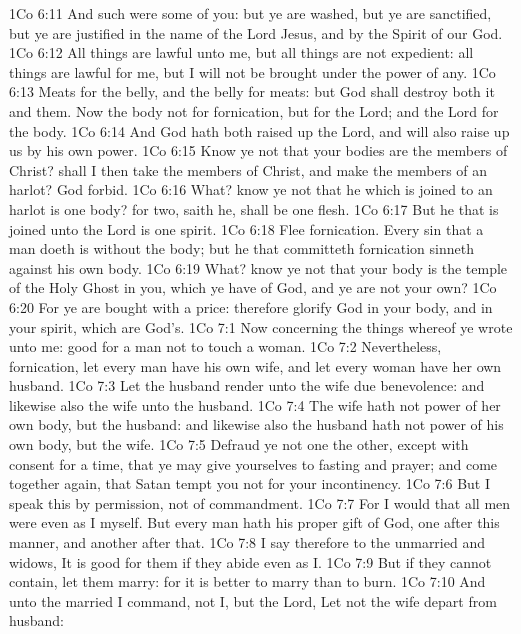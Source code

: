 \vs 1Co 6:11 And such were some of you: but ye are washed, but ye are sanctified, but ye are justified in the name of the Lord Jesus, and by the Spirit of our God.
\vs 1Co 6:12 All things are lawful unto me, but all things are not expedient: all things are lawful for me, but I will not be brought under the power of any.
\vs 1Co 6:13 Meats for the belly, and the belly for meats: but God shall destroy both it and them. Now the body  not for fornication, but for the Lord; and the Lord for the body.
\vs 1Co 6:14 And God hath both raised up the Lord, and will also raise up us by his own power.
\vs 1Co 6:15 Know ye not that your bodies are the members of Christ? shall I then take the members of Christ, and make  the members of an harlot? God forbid.
\vs 1Co 6:16 What? know ye not that he which is joined to an harlot is one body? for two, saith he, shall be one flesh.
\vs 1Co 6:17 But he that is joined unto the Lord is one spirit.
\vs 1Co 6:18 Flee fornication. Every sin that a man doeth is without the body; but he that committeth fornication sinneth against his own body.
\vs 1Co 6:19 What? know ye not that your body is the temple of the Holy Ghost  in you, which ye have of God, and ye are not your own?
\vs 1Co 6:20 For ye are bought with a price: therefore glorify God in your body, and in your spirit, which are God's.
\vs 1Co 7:1 Now concerning the things whereof ye wrote unto me:  good for a man not to touch a woman.
\vs 1Co 7:2 Nevertheless,  fornication, let every man have his own wife, and let every woman have her own husband.
\vs 1Co 7:3 Let the husband render unto the wife due benevolence: and likewise also the wife unto the husband.
\vs 1Co 7:4 The wife hath not power of her own body, but the husband: and likewise also the husband hath not power of his own body, but the wife.
\vs 1Co 7:5 Defraud ye not one the other, except  with consent for a time, that ye may give yourselves to fasting and prayer; and come together again, that Satan tempt you not for your incontinency.
\vs 1Co 7:6 But I speak this by permission,  not of commandment.
\vs 1Co 7:7 For I would that all men were even as I myself. But every man hath his proper gift of God, one after this manner, and another after that.
\vs 1Co 7:8 I say therefore to the unmarried and widows, It is good for them if they abide even as I.
\vs 1Co 7:9 But if they cannot contain, let them marry: for it is better to marry than to burn.
\vs 1Co 7:10 And unto the married I command,  not I, but the Lord, Let not the wife depart from  husband:

